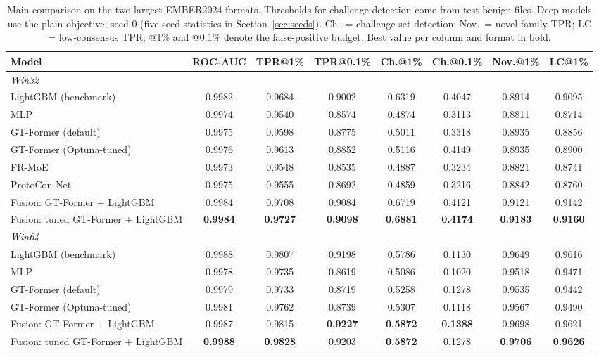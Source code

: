 \documentclass[fleqn,10pt]{wlscirep}
\makeatletter
\newcommand{\gtf}{GT\mbox{-}Former}
\newcommand{\lgbm}{LightGBM}
\newcommand{\tprat}[1]{TPR@#1\%}
\makeatother
\begin{document}
\begin{table}[!htbp]
\centering
\scriptsize
\setlength{\tabcolsep}{2.5pt}
\caption{Main comparison on the two largest EMBER2024 formats. Thresholds for challenge detection come from test benign files. Deep models use the plain objective, seed 0 (five-seed statistics in Section~\ref{sec:seeds}). Ch.\ = challenge-set detection; Nov.\ = novel-family TPR; LC = low-consensus TPR; @1\% and @0.1\% denote the false-positive budget. Best value per column and format in bold.}
\label{tab:main}
\begin{tabular}{lccccccc}
\toprule
Model & ROC-AUC & \tprat{1} & \tprat{0.1} & Ch.@1\% & Ch.@0.1\% & Nov.@1\% & LC@1\% \\
\midrule
\multicolumn{8}{l}{\textit{Win32}} \\
\lgbm{} (benchmark) & 0.9982 & 0.9684 & 0.9002 & 0.6319 & 0.4047 & 0.8914 & 0.9095 \\
MLP & 0.9974 & 0.9540 & 0.8574 & 0.4874 & 0.3113 & 0.8811 & 0.8714 \\
\gtf{} (default) & 0.9975 & 0.9598 & 0.8775 & 0.5011 & 0.3318 & 0.8935 & 0.8856 \\
\gtf{} (Optuna-tuned) & 0.9976 & 0.9613 & 0.8852 & 0.5116 & 0.4149 & 0.8935 & 0.8900 \\
FR-MoE & 0.9973 & 0.9548 & 0.8535 & 0.4887 & 0.3234 & 0.8821 & 0.8741 \\
ProtoCon-Net & 0.9975 & 0.9555 & 0.8692 & 0.4859 & 0.3216 & 0.8842 & 0.8760 \\
Fusion: \gtf{} + \lgbm{} & 0.9984 & 0.9708 & 0.9084 & 0.6719 & 0.4121 & 0.9121 & 0.9142 \\
Fusion: tuned \gtf{} + \lgbm{} & \textbf{0.9984} & \textbf{0.9727} & \textbf{0.9098} & \textbf{0.6881} & \textbf{0.4174} & \textbf{0.9183} & \textbf{0.9160} \\
\midrule
\multicolumn{8}{l}{\textit{Win64}} \\
\lgbm{} (benchmark) & 0.9988 & 0.9807 & 0.9198 & 0.5786 & 0.1130 & 0.9649 & 0.9616 \\
MLP & 0.9978 & 0.9735 & 0.8619 & 0.5086 & 0.1020 & 0.9518 & 0.9471 \\
\gtf{} (default) & 0.9979 & 0.9733 & 0.8719 & 0.5258 & 0.1278 & 0.9535 & 0.9442 \\
\gtf{} (Optuna-tuned) & 0.9981 & 0.9762 & 0.8739 & 0.5307 & 0.1118 & 0.9567 & 0.9490 \\
Fusion: \gtf{} + \lgbm{} & 0.9987 & 0.9815 & \textbf{0.9227} & \textbf{0.5872} & \textbf{0.1388} & 0.9698 & 0.9621 \\
Fusion: tuned \gtf{} + \lgbm{} & \textbf{0.9988} & \textbf{0.9828} & 0.9203 & \textbf{0.5872} & 0.1278 & \textbf{0.9706} & \textbf{0.9626} \\
\bottomrule
\end{tabular}
\end{table}
\end{document}
